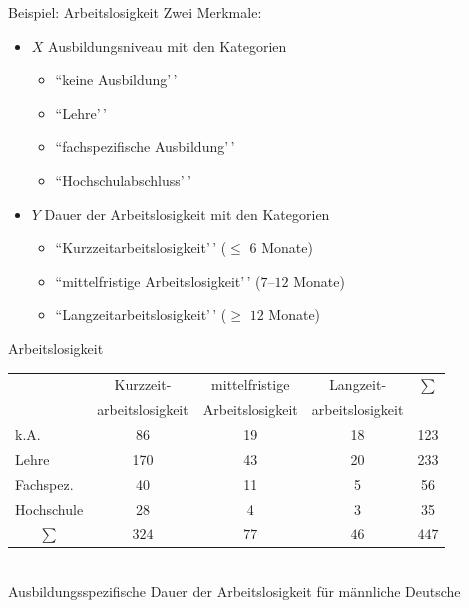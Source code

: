 \documentclass[
  10pt,
  ignorenonframetext,
]{beamer}
\providecommand{\tightlist}{%
  \setlength{\itemsep}{0pt}\setlength{\parskip}{0pt}}
\begin{document}
\begin{frame}{Beispiel: Arbeitslosigkeit}
\label{beispiel-arbeitslosigkeit}
Zwei Merkmale:

\begin{itemize}
\tightlist
\item
  \(X\) Ausbildungsniveau mit den Kategorien

  \begin{itemize}
  \tightlist
  \item
    ``keine Ausbildung'\,'
  \item
    ``Lehre'\,'
  \item
    ``fachspezifische Ausbildung'\,'
  \item
    ``Hochschulabschluss'\,'
  \end{itemize}
\item
  \(Y\) Dauer der Arbeitslosigkeit mit den Kategorien

  \begin{itemize}
  \tightlist
  \item
    ``Kurzzeitarbeitslosigkeit'\,' (\(\leq\) \(6\) Monate)
  \item
    ``mittelfristige Arbeitslosigkeit'\,' (\(7\)--\(12\) Monate)
  \item
    ``Langzeitarbeitslosigkeit'\,' (\(\geq\) \(12\) Monate)
  \end{itemize}
\end{itemize}
\end{frame}

\begin{frame}{Arbeitslosigkeit}
\label{arbeitslosigkeit}
\small

\begin{table}[hbt]
  \begin{center}
    \leavevmode\small
    \begin{tabular}{l|ccc|c}
\multicolumn{1}{c}{}
& \multicolumn{1}{c}{Kurzzeit-}
  & \multicolumn{1}{c}{mittelfristige}
    & \multicolumn{1}{c}{Langzeit-}
    & \multicolumn{1}{c}{$\sum$}\\
\multicolumn{1}{c}{}
& \multicolumn{1}{c}{arbeitslosigkeit}
  & \multicolumn{1}{c}{Arbeitslosigkeit}
    & \multicolumn{1}{c}{arbeitslosigkeit}\\\cline{2-4}
k.A.  & 86 & 19 & 18 & 123 \\
Lehre & 170 & 43 & 20 & 233 \\
Fachspez. & 40 & 11 & 5 & 56\\
Hochschule & 28 & 4 & 3 & 35\\\cline{2-4}
\multicolumn{1}{c}{$\sum$}
& \multicolumn{1}{c}{$324$}
  & \multicolumn{1}{c}{$77$}
    & \multicolumn{1}{c}{$46$}
      & \multicolumn{1}{c}{$447$}
    \end{tabular}
    \vspace{3mm}
    \\{Ausbildungsspezifische Dauer der Arbeitslosigkeit für männliche Deutsche}
\end{center}
\end{table}
\end{frame}
\end{document}
